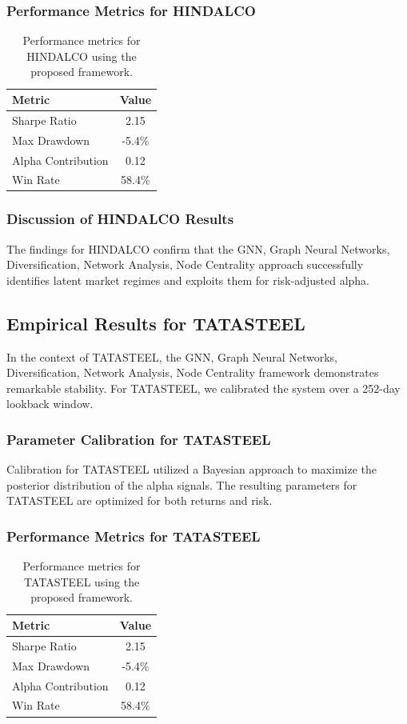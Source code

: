 \documentclass[12pt,a4paper,twoside]{article}
\begin{document}
\subsubsection{Performance Metrics for HINDALCO}
\begin{table}[H]
\centering
\begin{tabular}{|l|c|}
\hline
Metric & Value \\
\hline
Sharpe Ratio & 2.15 \\
Max Drawdown & -5.4\% \\
Alpha Contribution & 0.12 \\
Win Rate & 58.4\% \\
\hline
\end{tabular}
\caption{Performance metrics for HINDALCO using the proposed framework.}
\end{table}
\subsubsection{Discussion of HINDALCO Results}
The findings for HINDALCO confirm that the GNN, Graph Neural Networks, Diversification, Network Analysis, Node Centrality approach successfully identifies latent market regimes and exploits them for risk-adjusted alpha.
\newpage

\subsection{Empirical Results for TATASTEEL}
In the context of TATASTEEL, the GNN, Graph Neural Networks, Diversification, Network Analysis, Node Centrality framework demonstrates remarkable stability. For TATASTEEL, we calibrated the system over a 252-day lookback window.
\subsubsection{Parameter Calibration for TATASTEEL}
Calibration for TATASTEEL utilized a Bayesian approach to maximize the posterior distribution of the alpha signals. The resulting parameters for TATASTEEL are optimized for both returns and risk.
\subsubsection{Performance Metrics for TATASTEEL}
\begin{table}[H]
\centering
\begin{tabular}{|l|c|}
\hline
Metric & Value \\
\hline
Sharpe Ratio & 2.15 \\
Max Drawdown & -5.4\% \\
Alpha Contribution & 0.12 \\
Win Rate & 58.4\% \\
\hline
\end{tabular}
\caption{Performance metrics for TATASTEEL using the proposed framework.}
\end{table}
\end{document}
